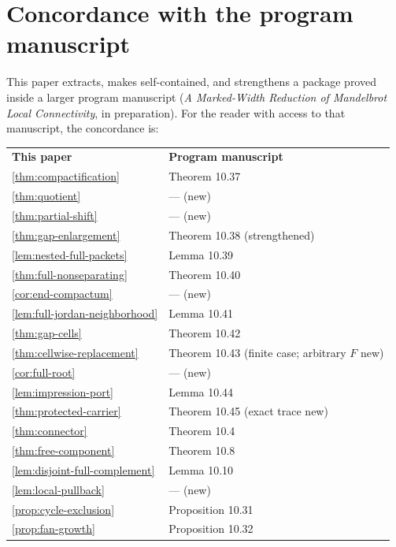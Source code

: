 \documentclass[11pt,reqno]{amsart}
\numberwithin{equation}{section}
\theoremstyle{plain}
\theoremstyle{definition}
\theoremstyle{remark}
\begin{document}
\appendix

\section{Concordance with the program manuscript}
\label{app:concordance}

This paper extracts, makes self-contained, and strengthens a package
proved inside a larger program manuscript (\emph{A Marked-Width
Reduction of Mandelbrot Local Connectivity}, in preparation).  For the
reader with access to that manuscript, the concordance is:

\begin{center}
\begin{tabular}{ll}
\textbf{This paper} & \textbf{Program manuscript}\\[2pt]
\cref{thm:compactification} & Theorem 10.37\\
\cref{thm:quotient} & --- (new)\\
\cref{thm:partial-shift} & --- (new)\\
\cref{thm:gap-enlargement} & Theorem 10.38 (strengthened)\\
\cref{lem:nested-full-packets} & Lemma 10.39\\
\cref{thm:full-nonseparating} & Theorem 10.40\\
\cref{cor:end-compactum} & --- (new)\\
\cref{lem:full-jordan-neighborhood} & Lemma 10.41\\
\cref{thm:gap-cells} & Theorem 10.42\\
\cref{thm:cellwise-replacement} & Theorem 10.43 (finite case;
  arbitrary $F$ new)\\
\cref{cor:full-root} & --- (new)\\
\cref{lem:impression-port} & Lemma 10.44\\
\cref{thm:protected-carrier} & Theorem 10.45 (exact trace new)\\
\cref{thm:connector} & Theorem 10.4\\
\cref{thm:free-component} & Theorem 10.8\\
\cref{lem:disjoint-full-complement} & Lemma 10.10\\
\cref{lem:local-pullback} & --- (new)\\
\cref{prop:cycle-exclusion} & Proposition 10.31\\
\cref{prop:fan-growth} & Proposition 10.32
\end{tabular}
\end{center}
\end{document}
